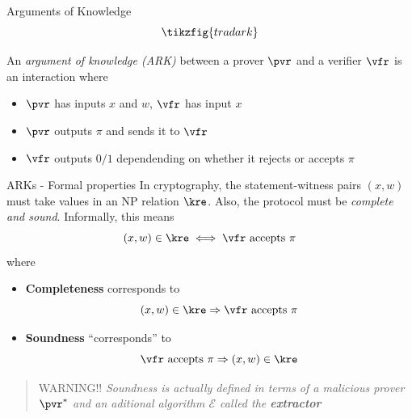\begin{frame}{Arguments of Knowledge}
	\Large
	\[
		\tikzfig{tradark}
	\]
	\normalsize
	\begin{definition}
		An \emph{argument of knowledge (ARK)} between a prover $\pvr$
		and a verifier $\vfr$ is an interaction where
		\begin{itemize}
			\item $\pvr$ has inputs $x$ and $w$, $\vfr$ has input $x$
			\item $\pvr$ outputs $\pi$ and sends it to
				$\vfr$
			\item $\vfr$ outputs $0/1$ dependending on whether
				it rejects or accepts $\pi$
		\end{itemize}
	\end{definition}
\end{frame}

\begin{frame}{ARKs - Formal properties}
	In cryptography, the statement-witness pairs $(x,w)$ must take values
	in an NP relation $\kre$. Also, the protocol must be
	\emph{complete and sound}. Informally, this means
	\[
		(x,w) \in \kre \iff \mbox{$\vfr$ accepts $\pi$}
	\]
	where
	\begin{itemize}
		\item \textbf{Completeness} corresponds to
			\[
				(x,w) \in \kre \Rightarrow
				\mbox{$\vfr$ accepts $\pi$}
			\]
		\item \textbf{Soundness} ``corresponds'' to
			\[
				\mbox{$\vfr$ accepts $\pi$} \Rightarrow
				(x,w) \in \kre
			\]
	\end{itemize}
	\begin{quote}
		WARNING!! \emph{Soundness is actually defined in terms of a malicious
		prover $\pvr^*$ and an aditional algorithm $\mathcal{E}$
		called the \textbf{extractor}}
	\end{quote}
\end{frame}

